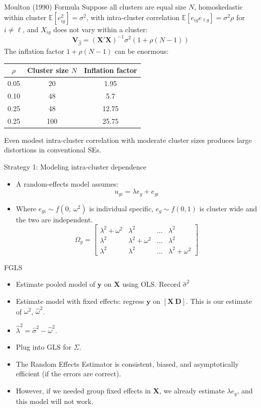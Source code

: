 \documentclass[aspectratio=169]{beamer}
\numberwithin{equation}{section}
\begin{document}
\begin{frame}{Moulton (1990) Formula}
Suppose all clusters are equal size $N$, homoskedastic within cluster $\mathbb{E}[e_{ig}^2]=\sigma^2$, with intra-cluster correlation $\mathbb{E}[e_{ig}e_{\ell g}]=\sigma^2\rho$ for $i\neq \ell$, and $X_{ig}$ does not vary within a cluster:
$$\bm{V}_{\hat{\beta}}=\left(\bm{X'X}\right)^{-1}\sigma^2(1+\rho(N-1))$$\pause
The \alert{inflation factor} $1+\rho(N-1)$ can be enormous:
\begin{center}
\begin{tabular}{ccc}
\toprule
$\rho$ & Cluster size $N$ & Inflation factor \\
\midrule
0.05 & 20 & 1.95 \\
0.10 & 48 & 5.7 \\
0.25 & 48 & \alert{12.75} \\
0.25 & 100 & \alert{25.75} \\
\bottomrule
\end{tabular}
\end{center}
Even modest intra-cluster correlation with moderate cluster sizes produces large distortions in conventional SEs.
 \end{frame}
 
\begin{frame}{Strategy 1: Modeling intra-cluster dependence}
\begin{itemize}
\item A random-effects model assumes:
$$u_{gi}=\lambda e_g+e_{gi}$$
\item Where $e_{gi}\sim f(0,\ \omega^2)$ is individual specific, $e_g\sim f(0,1)$ is cluster wide and the two are independent.
$$\Omega_g =\begin{bmatrix} \lambda^2+\omega^2 & \lambda^2& \ldots& \lambda^2\\
\lambda^2 & \lambda^2+\omega^2 & \ldots& \lambda^2\\
\lambda^2& \lambda^2& \ldots& \lambda^2+\omega^2\end{bmatrix}$$

\end{itemize}
\end{frame}
  
\begin{frame}{FGLS}
\begin{itemize}
\item Estimate pooled model of $\bm{y}$ on $\bm{X}$ using OLS.  Record $\hat{\sigma}^2$   \pause
\item Estimate model with fixed effects: regress $\bm{y}$ on $[\bm{X}\ \bm{D}]$. This is our estimate of $\omega^2$, $\hat{\omega}^2$. \pause
\item $\hat{\lambda}^2=\hat{\sigma}^2-\hat{\omega}^2$. \pause
\item Plug into GLS for $\Sigma$. \pause
\item The Random Effects Estimator is consistent, biased, and asymptotically efficient (if the errors are correct). \pause
\item However, if we needed group fixed effects in $\bm{X}$, we already estimate $\lambda e_g$, and this model will not work.
\end{itemize}

\end{frame}
  
\end{document}
